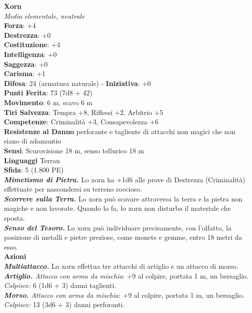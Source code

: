 \begin{multicols}{2}
\medskip\textbf{Xorn}\\
\emph{Media elementale, neutrale}\\
\textbf{Forza}: +4\\
\textbf{Destrezza}: +0\\
\textbf{Costituzione}: +4\\
\textbf{Intelligenza}: +0\\
\textbf{Saggezza}: +0\\
\textbf{Carisma}: +1\\
\textbf{Difesa}: 24 (armatura naturale) - \textbf{Iniziativa}: +0\\
\textbf{Punti Ferita}: 73 (7d8 + 42)\\
\textbf{Movimento}: 6 m, scavo 6 m\\
\textbf{Tiri Salvezza}: Tempra +8, Riflessi +2, Arbitrio +5\\
\textbf{Competenze}: Criminalità +3, Consapevolezza +6\\
\textbf{Resistenze al Danno} perforante e tagliente di attacchi non magici che non siano di adamantio\\
\textbf{Sensi}: Scurovisione 18 m, senso tellurico 18 m\\
\textbf{Linguaggi} Terran\\
\textbf{Sfida}: 5 (1.800 PE)\smallskip\\
\emph{\textbf{Mimetismo di Pietra.}} Lo xorn ha +1d6 alle prove di Destrezza (Criminalità) effettuate per nascondersi su terreno roccioso.\\
\emph{\textbf{Scorrere sulla Terra.}} Lo xorn può scavare attraversa la terra e la pietra non magiche e non lavorate. Quando lo fa, lo xorn non disturba il materiale che sposta.\\
\emph{\textbf{Senso del Tesoro.}} Lo xorn può individuare precisamente, con l'olfatto, la posizione di metalli e pietre preziose, come monete e gemme, entro 18 metri da esso.\\
\smallskip\textbf{Azioni}\\
\emph{\textbf{Multiattacco.}} Lo xorn effettua tre attacchi di artiglio e un attacco di morso.\\
\emph{\textbf{Artiglio.} Attacco con arma da mischia}: +9 al colpire, portata 1 m, un bersaglio.\\
\emph{Colpisce:} 6 (1d6 + 3) danni taglienti.\\
\emph{\textbf{Morso.} Attacco con arma da mischia}: +9 al colpire, portata 1 m, un bersaglio.\\
\emph{Colpisce:} 13 (3d6 + 3) danni perforanti.\\

\end{multicols}
